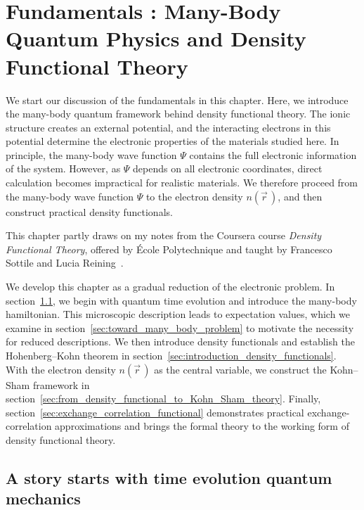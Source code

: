 \chapter[Fundamentals \textRoman{1}: Many-Body Quantum Physics and DFT]{Fundamentals : Many-Body Quantum Physics and Density Functional Theory}
\label{cha:fundamentals_a}

We start our discussion of the fundamentals in this chapter.
Here, we introduce the many-body quantum framework behind density functional theory.
The ionic structure creates an external potential, and the interacting electrons in this potential determine the electronic properties of the materials studied here.
In principle, the many-body wave function $\Psi$ contains the full electronic information of the system.
However, as $\Psi$ depends on all electronic coordinates, direct calculation becomes impractical for realistic materials.
We therefore proceed from the many-body wave function $\Psi$ to the electron density $n(\vec{r}\,)$, and then construct practical density functionals.

This chapter partly draws on my notes from the Coursera course \textit{Density Functional Theory}, offered by École Polytechnique and taught by Francesco Sottile and Lucia Reining~\cite{sottile_reining_dft_coursera}.

We develop this chapter as a gradual reduction of the electronic problem.
In section~\ref{sec:time_evolution_quantum_mechanics}, we begin with quantum time evolution and introduce the many-body hamiltonian.
This microscopic description leads to expectation values, which we examine in section~\ref{sec:toward_many_body_problem} to motivate the necessity for reduced descriptions.
We then introduce density functionals and establish the Hohenberg--Kohn theorem in section~\ref{sec:introduction_density_functionals}.
With the electron density $n(\vec{r}\,)$ as the central variable, we construct the Kohn--Sham framework in section~\ref{sec:from_density_functional_to_Kohn_Sham_theory}.
Finally, section~\ref{sec:exchange_correlation_functional} demonstrates practical exchange-correlation approximations and brings the formal theory to the working form of density functional theory.

\newpage
\section{A story starts with time evolution quantum mechanics}
\label{sec:time_evolution_quantum_mechanics}

